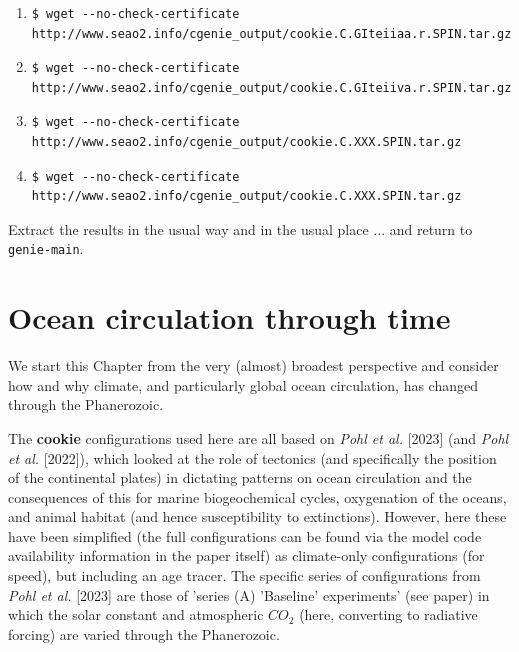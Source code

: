 \begin{enumerate}[noitemsep]
\vspace{2mm}
\item[\textbf{Holocene:}]
\footnotesize\begin{verbatim}
$ wget --no-check-certificate http://www.seao2.info/cgenie_output/cookie.C.GIteiiaa.r.SPIN.tar.gz
\end{verbatim}\small
\vspace{2mm}
\item[\textbf{LGM:}]
\footnotesize\begin{verbatim}
$ wget --no-check-certificate http://www.seao2.info/cgenie_output/cookie.C.GIteiiva.r.SPIN.tar.gz
\end{verbatim}\small
\vspace{2mm}
\item[\textbf{Eocene:}]
\footnotesize\begin{verbatim}
$ wget --no-check-certificate http://www.seao2.info/cgenie_output/cookie.C.XXX.SPIN.tar.gz
\end{verbatim}\small
\vspace{2mm}
\item[\textbf{Cretaceous:}]
\footnotesize\begin{verbatim}
$ wget --no-check-certificate http://www.seao2.info/cgenie_output/cookie.C.XXX.SPIN.tar.gz
\end{verbatim}\small
\end{enumerate}

\vspace{2mm}

\noindent Extract the results in the usual way and in the usual place ... and return to \texttt{genie-main}.

\newpage

\section{Ocean circulation through time}

We start this Chapter from the very (almost) broadest perspective and consider how and why climate, and particularly global ocean circulation, has changed through the Phanerozoic.

\vspace{1mm}
The \textbf{cookie} configurations used here are all based on \textit{Pohl et al.} [2023] (and \textit{Pohl et al.} [2022]), which looked at the role of tectonics (and specifically the position of the continental plates) in dictating patterns on ocean circulation and the consequences of this for marine biogeochemical cycles, oxygenation of the oceans, and animal habitat (and hence susceptibility to extinctions). However, here these have been simplified (the full configurations can be found via the model code availability information in the paper itself) as climate-only configurations (for speed), but including an age tracer. The specific series of configurations from \textit{Pohl et al.} [2023] are those of 'series (A) 'Baseline' experiments' (see paper) in which the solar constant and atmospheric \(CO_{2}\) (here, converting to radiative forcing) are varied through the Phanerozoic.

